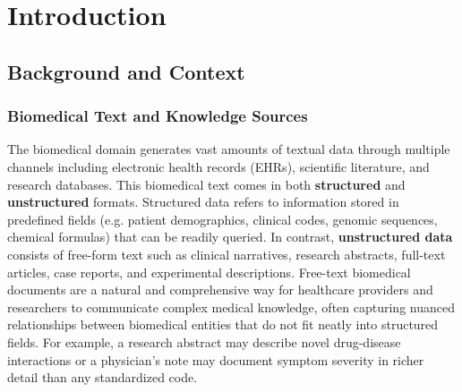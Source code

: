 
\chapter{Introduction} %

\label{Chapter1} %


\newcommand{\keyword}[1]{\textbf{#1}}
\newcommand{\tabhead}[1]{\textbf{#1}}
\newcommand{\code}[1]{\texttt{#1}}
\newcommand{\file}[1]{\texttt{\bfseries#1}}
\newcommand{\option}[1]{\texttt{\itshape#1}}


\section{Background and Context}

\subsection{Biomedical Text and Knowledge Sources}

The biomedical domain generates vast amounts of textual data through multiple channels including electronic health records (EHRs), scientific literature, and research databases. This biomedical text comes in both \textbf{structured} and \textbf{unstructured} formats. Structured data refers to information stored in predefined fields (e.g. patient demographics, clinical codes, genomic sequences, chemical formulas) that can be readily queried. In contrast, \textbf{unstructured data} consists of free-form text such as clinical narratives, research abstracts, full-text articles, case reports, and experimental descriptions. Free-text biomedical documents are a natural and comprehensive way for healthcare providers and researchers to communicate complex medical knowledge, often capturing nuanced relationships between biomedical entities that do not fit neatly into structured fields. For example, a research abstract may describe novel drug-disease interactions or a physician's note may document symptom severity in richer detail than any standardized code.

